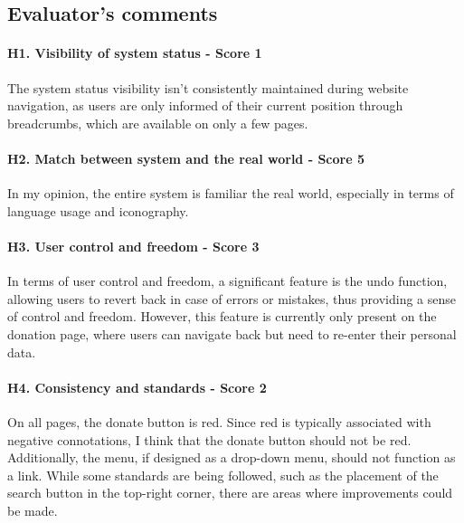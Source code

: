 \subsection*{Evaluator's comments}
\paragraph{H1. Visibility of system status - Score 1}	The system status visibility isn't consistently maintained during website navigation, as users are only informed of their current position through breadcrumbs, which are available on only a few pages.
\newline
\paragraph{H2. Match between system and the real world - Score 5}	In my opinion, the entire system is familiar the real world, especially in terms of language usage and iconography.
\newline
\paragraph{H3. User control and freedom - Score 3}	In terms of user control and freedom, a significant feature is the undo function, allowing users to revert back in case of errors or mistakes, thus providing a sense of control and freedom. However, this feature is currently only present on the donation page, where users can navigate back but need to re-enter their personal data.
\newline
\paragraph{H4. Consistency and standards - Score 2}	On all pages, the donate button is red. Since red is typically associated with negative connotations, I think that the donate button should not be red. Additionally, the menu, if designed as a drop-down menu, should not function as a link. While some standards are being followed, such as the placement of the search button in the top-right corner, there are areas where improvements could be made.
\newline
